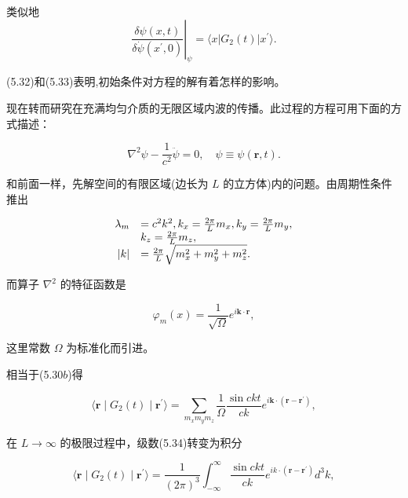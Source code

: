 类似地
\begin{equation*}
\left. \frac {\delta \psi (x , t)}{\delta \dot {\psi} \left(x ^ {\prime} , 0\right)} \right| _ {\psi} = \langle x | G _ {2} (t) | x ^ {\prime} \rangle .\tag{5.33}
\end{equation*}

(5.32)和(5.33)表明,初始条件对方程的解有着怎样的影响。

现在转而研究在充满均匀介质的无限区域内波的传播。此过程的方程可用下面的方式描述：

\begin{equation*}
\nabla^ {2} \psi - \frac {1}{c ^ {2}} \ddot {\psi} = 0, \quad \psi \equiv \psi (\boldsymbol {r}, t).
\end{equation*}

和前面一样，先解空间的有限区域(边长为 $L$ 的立方体)内的问题。由周期性条件推出

\begin{equation*}
\begin{array}{r l} \lambda_ {m} & = c ^ {2} k ^ {2}, k _ {x} = \frac {2 \pi}{L} m _ {x}, k _ {y} = \frac {2 \pi}{L} m _ {y}, \\ & k _ {z} = \frac {2 \pi}{L} m _ {z}, \\ | k | & = \frac {2 \pi}{L} \sqrt {m _ {x} ^ {2} + m _ {y} ^ {2} + m _ {z} ^ {2}}. \end{array}
\end{equation*}

而算子 $\nabla^2$ 的特征函数是

\begin{equation*}
\varphi_ {m} (x) = \frac {1}{\sqrt {\Omega}} e ^ {i \boldsymbol {k} \cdot \boldsymbol {r}},
\end{equation*}

这里常数 $\Omega$ 为标准化而引进。

相当于(5.30$b$)得

\begin{equation*}
\langle \boldsymbol {r} \mid G _ {2} (t) \mid \boldsymbol {r} ^ {\prime} \rangle = \sum_ {m _ {x} m _ {y} m _ {z}} \frac {1}{\Omega} \frac {\sin c k t}{c k} e ^ {i \boldsymbol {k} \cdot (\boldsymbol {r} - \boldsymbol {r} ^ {\prime})},\tag{5.34}
\end{equation*}

在 $L \to \infty$ 的极限过程中，级数(5.34)转变为积分

\begin{equation*}
\langle \boldsymbol {r} \mid G _ {2} (t) \mid \boldsymbol {r} ^ {\prime} \rangle = \frac {1}{(2 \pi) ^ {3}} \int_ {- \infty} ^ {\infty} \frac {\sin c k t}{c k} e ^ {i k \cdot (\boldsymbol {r} - \boldsymbol {r} ^ {\prime})} d ^ {3} k,\tag{5.35}
\end{equation*}

